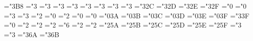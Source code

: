{ \mathchardef\bmbulletdashcirc="3\mtbsy@@ B8
 \mathchardef\bmleftarrow="3 \let\bmgets=\bmleftarrow
 \mathchardef\bmrightarrow="3 \let\bmto=\bmrightarrow
 \def\bmuparrow{\delimiter"3\mtbsyt@@22\mtbex@@78 }%
 \def\bmdownarrow{\delimiter"3\mtbsyt@@23\mtbex@@79 }%
 \mathchardef\bmleftrightarrow="3
 \def\bmuparrow{\delimiter"3\mtbsy@@22378 }%
 \def\bmdownarrow{\delimiter"3\mtbsy@@23379 }%
 \mathchardef\bmnearrow="3
 \mathchardef\bmsearrow="3
 \mathchardef\bmsimeq="3
 \mathchardef\bmLeftarrow="3
 \mathchardef\bmRightarrow="3
 \def\bmUparrow{\delimiter"3\mtbsy@@2A\mtbex@@7E }%
 \def\bmDownarrow{\delimiter"3\mtbsy@@2B\mtbex@@7F }%
 \mathchardef\bmLeftrightarrow="3\mtbsy@@2C
 \mathchardef\bmnwarrow="3\mtbsy@@2D
 \mathchardef\bmswarrow="3\mtbsy@@2E
 \mathchardef\bmpropto="3\mtbsy@@2F
 \mathchardef\bmprime="0
 \mathchardef\bminfty="0
 \mathchardef\bmin="3
 \mathchardef\bmni="3 \let\bmowns=\bmni
 \mathchardef\bmbigtriangleup="2
 \mathchardef\bmtriangle="0
 \mathchardef\bmbigtriangledown="2
 \mathchardef\bmforall="0
 \mathchardef\bmexists="0
 \mathchardef\bmneg="0\mtbsy@@3A \let\lnot=\neg
 \mathchardef\bmemptyset="0\mtbsy@@3B
 \mathchardef\bmRe="0\mtbsy@@3C
 \mathchardef\bmIm="0\mtbsy@@3D
 \mathchardef\bmtop="0\mtbsy@@3E
 \mathchardef\bmbot="0\mtbsy@@3F
 \mathchardef\bmperp="3\mtbsy@@3F
 \mathchardef\bmaleph="0
 \mathchardef\bmcomp="2
 \def\bmvec{\mathaccent"0\mtbsy@@45 }%
 \mathchardef\bmtriangleright="2
 \mathchardef\bmtriangleleft="2
 \mathchardef\bmcolon="6
 \mathchardef\bmsetdif="2
 \mathchardef\bmcupprod="2
 \mathchardef\bmcapprod="2\mtbsy@@5A
 \mathchardef\bmcup="2\mtbsy@@5B
 \mathchardef\bmcap="2\mtbsy@@5C
 \mathchardef\bmuplus="2\mtbsy@@5D
 \mathchardef\bmwedge="2\mtbsy@@5E \let\bmland=\bmwedge
 \mathchardef\bmvee="2\mtbsy@@5F \let\bmlor=\bmvee
 \mathchardef\bmvdash="3
 \mathchardef\bmdashv="3
 \def\bmlfloor{\delimiter"4\mtbsy@@62\mtbex@@04 }%
 \def\bmrfloor{\delimiter"5\mtbsy@@63\mtbex@@05 }%
 \def\bmlceil{\delimiter"4\mtbsy@@64\mtbex@@06 }%
 \def\bmrceil{\delimiter"5\mtbsy@@65\mtbex@@07 }%
 \def\bmlbrace{\delimiter"4\mtbsy@@66\mtbex@@08 }%
 \def\bmrbrace{\delimiter"5\mtbsy@@67\mtbex@@09 }%
 \def\bmlangle{\delimiter"4\mtbsy@@68\mtbex@@0A }%
 \def\bmrangle{\delimiter"5\mtbsy@@69\mtbex@@0B }%
 \mathchardef\bmmid="3\mtbsy@@6A
 \def\bmvert{\delimiter"\mtbsy@@6A\mtbex@@0C }%
 \mathchardef\bmparallel="3\mtbsy@@6B
}
